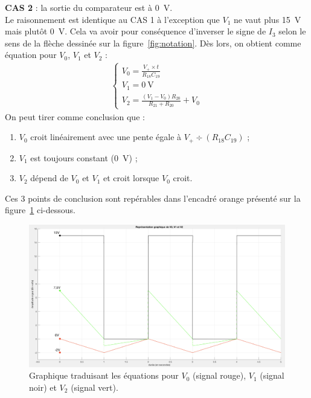 \documentclass[10pt, oneside, a4paper]{article}
\begin{document}
\noindent\textbf{CAS 2} : la sortie du comparateur est à \SI{0}{\volt}. \\
Le raisonnement est identique au CAS 1 à l'exception que $V_1$ ne vaut plus \SI{15}{\volt} mais plutôt \SI{0}{\volt}.
Cela va avoir pour conséquence d'inverser le signe de $I_3$ selon le sens de la flèche dessinée sur la figure~\ref{fig:notation}.
Dès lors, on obtient comme équation pour $V_0$, $V_1$ et $V_2$ :
\begin{gather}
    \begin{cases}
        V_0 = \frac{V_+ \times t}{R_{18}C_{19}} \\[2mm]
        V_1 = \SI{0}{\volt} \\[2mm]
        V_2 = \frac{(V_1 - V_0) R_{20}}{R_{21}+R_{20}} + V_0
    \end{cases}
\end{gather}
On peut tirer comme conclusion que :
\begin{enumerate}
    \item $V_0$ croit linéairement avec une pente égale à $V_+ \div \left(R_{18}
        C_{19}\right)$ ;
    \item $V_1$ est toujours constant (\SI{0}{\volt}) ;
    \item $V_2$ dépend de $V_0$ et $V_1$ et croit lorsque $V_0$ croit.
\end{enumerate}
Ces 3 points de conclusion sont repérables dans l'encadré orange présenté sur la figure~\ref{fig:Graphe_Sigma_Delta} ci-dessous.
\begin{figure}[!ht]
    \centering
    \includegraphics[width=\textwidth]{image/Sigma_Delta_Graphe.png}
    \caption{Graphique traduisant les équations pour $V_0$ (signal rouge), $V_1$ (signal noir) et $V_2$ (signal vert).}
    \label{fig:Graphe_Sigma_Delta}
\end{figure}
\newpage
\end{document}
